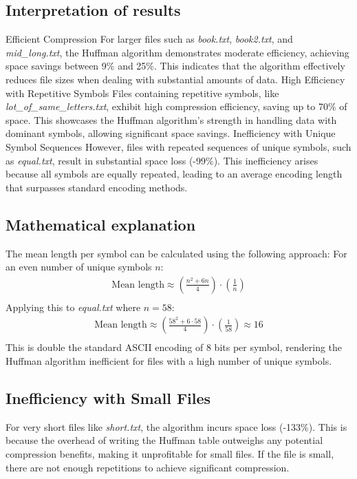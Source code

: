 \documentclass[12pt,oneside,letterpaper,english]{article}
\begin{document}
\subsection*{Interpretation of results}
Efficient Compression
For larger files such as \textit{book.txt}, \textit{book2.txt}, and \textit{mid\_long.txt}, the Huffman algorithm demonstrates moderate efficiency, achieving space savings between 9\% and 25\%. This indicates that the algorithm effectively reduces file sizes when dealing with substantial amounts of data.
High Efficiency with Repetitive Symbols
Files containing repetitive symbols, like \textit{lot\_of\_same\_letters.txt}, exhibit high compression efficiency, saving up to 70\% of space. This showcases the Huffman algorithm's strength in handling data with dominant symbols, allowing significant space savings.
Inefficiency with Unique Symbol Sequences
However, files with repeated sequences of unique symbols, such as \textit{equal.txt}, result in substantial space loss (-99\%). This inefficiency arises because all symbols are equally repeated, leading to an average encoding length that surpasses standard encoding methods.
\subsection*{Mathematical explanation}
The mean length per symbol can be calculated using the following approach:
For an even number of unique symbols $n$:
\begin{align*}
    \text{Mean length} \approx (\frac{n^2+6n}{4}) \cdot (\frac{1}{n})\\
\end{align*}
Applying this to \textit{equal.txt} where $n=58$:
\begin{align*}
    \text{Mean length} \approx (\frac{58^2+6\cdot 58}{4}) \cdot (\frac{1}{58}) \approx 16\\
\end{align*}
This is double the standard ASCII encoding of 8 bits per symbol, rendering the Huffman algorithm inefficient for files with a high number of unique symbols.

\subsection*{Inefficiency with Small Files}
For very short files like \textit{short.txt}, the algorithm incurs space loss (-133\%). This is because the overhead of writing the Huffman table outweighs any potential compression benefits, making it unprofitable for small files. If the file is small, there are not enough repetitions to achieve significant compression.
\end{document}
